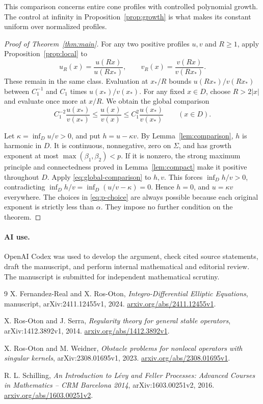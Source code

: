 \documentclass[11pt]{article}
\numberwithin{equation}{section}
\begin{document}
This comparison concerns entire cone profiles with controlled polynomial
growth. The control at infinity in Proposition~\ref{prop:growth} is what
makes its constant uniform over normalized profiles.

\begin{proof}[Proof of Theorem~\ref{thm:main}]
For any two positive profiles \(u,v\) and \(R\ge1\), apply
Proposition~\ref{prop:local} to
\[
 u_R(x)=\frac{u(Rx)}{u(Rx_*)},\qquad
 v_R(x)=\frac{v(Rx)}{v(Rx_*)}.
\]
These remain in the same class. Evaluation at \(x_*/R\) bounds
\(u(Rx_*)/v(Rx_*)\) between \(C_1^{-1}\) and \(C_1\) times
\(u(x_*)/v(x_*)\). For any fixed \(x\in D\), choose \(R>2|x|\) and
evaluate once more at \(x/R\). We obtain the global comparison
\begin{equation}\label{eq:global-comparison}
 C_1^{-2}\frac{u(x_*)}{v(x_*)}
 \le\frac{u(x)}{v(x)}
 \le C_1^2\frac{u(x_*)}{v(x_*)}\qquad(x\in D).
\end{equation}

Let \(\kappa=\inf_D u/v>0\), and put \(h=u-\kappa v\).
By Lemma~\ref{lem:comparison}, \(h\) is harmonic in \(D\).
It is continuous, nonnegative, zero on \(\Sigma\), and has growth exponent
at most \(\max(\beta_1,\beta_2)<p\). If it is nonzero, the strong maximum
principle and connectedness proved in Lemma~\ref{lem:compact} make it
positive throughout \(D\). Apply \eqref{eq:global-comparison} to \(h,v\).
This forces \(\inf_D h/v>0\), contradicting
\(\inf_D h/v=\inf_D(u/v-\kappa)=0\). Hence \(h=0\), and
\(u=\kappa v\) everywhere. The choices in \eqref{eq:p-choice} are always
possible because each original exponent is strictly less than \(\alpha\).
They impose no further condition on the theorem.
\end{proof}

\paragraph{AI use.}
OpenAI Codex was used to develop the argument, check cited source statements,
draft the manuscript, and perform internal mathematical and editorial review.
The manuscript is submitted for independent mathematical scrutiny.

\begin{thebibliography}{9}
X. Fernandez-Real and X. Ros-Oton,
\emph{Integro-Differential Elliptic Equations},
manuscript, arXiv:2411.12455v1, 2024.
\href{https://arxiv.org/abs/2411.12455v1}{arxiv.org/abs/2411.12455v1}.

X. Ros-Oton and J. Serra,
\emph{Regularity theory for general stable operators},
arXiv:1412.3892v1, 2014.
\href{https://arxiv.org/abs/1412.3892v1}{arxiv.org/abs/1412.3892v1}.

X. Ros-Oton and M. Weidner,
\emph{Obstacle problems for nonlocal operators with singular kernels},
arXiv:2308.01695v1, 2023.
\href{https://arxiv.org/abs/2308.01695v1}{arxiv.org/abs/2308.01695v1}.

R. L. Schilling,
\emph{An Introduction to L\'evy and Feller Processes:
Advanced Courses in Mathematics -- CRM Barcelona 2014},
arXiv:1603.00251v2, 2016.
\href{https://arxiv.org/abs/1603.00251v2}{arxiv.org/abs/1603.00251v2}.
\end{thebibliography}
\end{document}
